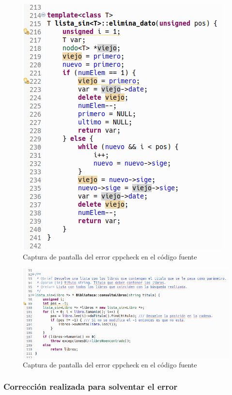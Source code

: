 			\begin{figure}[H]
				\centering
				\includegraphics[scale=0.55]{img/captura68.png}
				\caption{Captura de pantalla del error cppcheck en el código fuente}
				\label{captura68}
			\end{figure}
		
			\begin{figure}[H]
				\centering
				\includegraphics[scale=0.55]{img/captura69.png}
				\caption{Captura de pantalla del error cppcheck en el código fuente}
				\label{captura69}
			\end{figure}
		
		\subsubsection{Corrección realizada para solventar el error}
		
